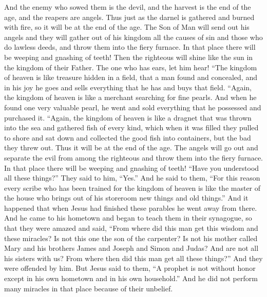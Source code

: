 \begin{biblechapter}
\verse And the enemy who sowed them is the devil, and the harvest is the end of the age, and the reapers are angels.
\verse Thus just as the darnel is gathered and burned with fire, so it will be at the end of the age.
\verse The Son of Man will send out his angels and they will gather out of his kingdom all the causes of sin and those who do lawless deeds,
\verse and throw them into the fiery furnace. In that place there will be weeping and gnashing of teeth!
\verse Then the righteous will shine like the sun in the kingdom of their Father. The one who has ears, let him hear!
 “The kingdom of heaven is like treasure hidden in a field, that a man found and concealed, and in his joy he goes and sells everything that he has and buys that field.
 “Again, the kingdom of heaven is like a merchant searching for fine pearls.
\verse And when he found one very valuable pearl, he went and sold everything that he possessed and purchased it.
 “Again, the kingdom of heaven is like a dragnet that was thrown into the sea and gathered fish of every kind,
\verse which when it was filled they pulled to shore and sat down and collected the good fish into containers, but the bad they threw out.
\verse Thus it will be at the end of the age. The angels will go out and separate the evil from among the righteous
\verse and throw them into the fiery furnace. In that place there will be weeping and gnashing of teeth!
\verse “Have you understood all these things?” They said to him, “Yes.”
\verse And he said to them, “For this reason every scribe who has been trained for the kingdom of heaven is like the master of the house who brings out of his storeroom new things and old things.”
 And it happened that when Jesus had finished these parables he went away from there.
\verse And he came to his hometown and began to teach them in their synagogue, so that they were amazed and said, “From where did this man get this wisdom and these miracles?
\verse Is not this one the son of the carpenter? Is not his mother called Mary and his brothers James and Joseph and Simon and Judas?
\verse And are not all his sisters with us? From where then did this man get all these things?”
\verse And they were offended by him. But Jesus said to them, “A prophet is not without honor except in his own hometown and in his own household.”
\verse And he did not perform many miracles in that place because of their unbelief.
\end{biblechapter}

